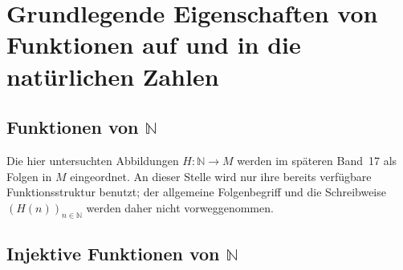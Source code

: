 \documentclass[main.tex]{subfiles}
\begin{document}
\section{Grundlegende Eigenschaften von Funktionen auf und in die natürlichen Zahlen}

\subsection{Funktionen von \(\mathbb{N}\)}

Die hier untersuchten Abbildungen \(H\colon\mathbb N\to M\) werden im
späteren Band~17 als Folgen in \(M\) eingeordnet. An dieser Stelle wird nur
ihre bereits verfügbare Funktionsstruktur benutzt; der allgemeine
Folgenbegriff und die Schreibweise \((H(n))_{n\in\mathbb N}\) werden daher
nicht vorweggenommen.

\begin{tabproof}
\end{tabproof}

\begin{tabproof}
\end{tabproof}

\subsection{Injektive Funktionen von \(\mathbb{N}\)}

\begin{tabproof}
\end{tabproof}
\end{document}
